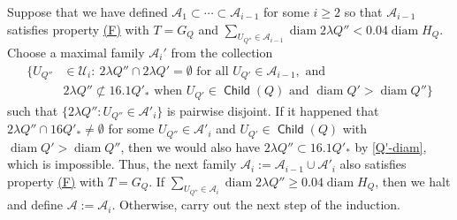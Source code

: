 \documentclass[12pt]{amsart}
\numberwithin{equation}{section}
\theoremstyle{plain}
\theoremstyle{definition}
\newcommand{\diam}{\mathop\mathrm{diam}\nolimits}
\newcommand{\Child}{\mathop\mathsf{Child}\nolimits}
\numberwithin{figure}{section}
\begin{document}
Suppose that we have defined $\mathcal{A}_1\subset\cdots\subset \mathcal{A}_{i-1}$ for some $i\geq 2$ so that  $\mathcal{A}_{i-1}$ satisfies property \hyperref[property-F]{(F)} with $T=G_Q$ and  $\sum_{U_{Q''}\in\mathcal{A}_{i-1}}\diam 2\lambda Q''< 0.04 \diam H_Q$.  Choose a maximal family $\mathcal{A}_i'$ from the collection
\begin{equation}\begin{split}\label{U-subcollection}
\{U_{Q''} &\in \mathcal{U}_i :\ 2\lambda Q'' \cap 2\lambda Q'=\emptyset\text{ for all }U_{Q'}\in \mathcal{A}_{i-1},\text{ and}\\
 &2\lambda Q''\not\subset 16.1Q'_*\text{ when }U_{Q'}\in \Child(Q) \text{ and } \diam Q' > \diam Q''\}
\end{split}\end{equation}
such that $\{2\lambda Q'': U_{Q''} \in \mathcal{A}'_i\}$ is pairwise disjoint. If it happened that $2\lambda Q''\cap 16Q'_*\neq\emptyset$ for some $U_{Q''}\in\mathcal{A}'_i$ and $U_{Q'}\in \Child(Q)$ with $\diam Q'>\diam Q''$, then we would also have $2\lambda Q''\subset 16.1Q'_*$ by \eqref{Q'-diam}, which is impossible. Thus, the next family $\mathcal{A}_i:=\mathcal{A}_{i-1}\cup\mathcal{A}'_i$ also satisfies property \hyperref[property-F]{(F)} with $T=G_Q$. If $\sum_{U_{Q''} \in \mathcal{A}_i} \diam 2\lambda Q'' \ge 0.04 \diam H_Q$, then we halt and define $\mathcal{A}:= \mathcal{A}_i$. Otherwise, carry out the next step of the induction.
\end{document}
